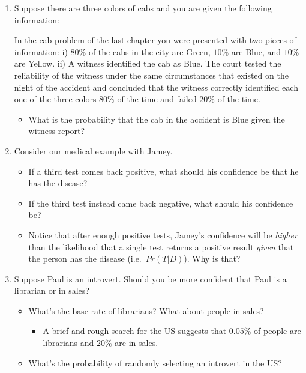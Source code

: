 \documentclass[]{tufte-book}
\providecommand{\tightlist}{%
  \setlength{\itemsep}{0pt}\setlength{\parskip}{0pt}}
\begin{document}
\begin{enumerate}
\def\labelenumi{\arabic{enumi}.}
\item
  Suppose there are three colors of cabs and you are given the following information:

  In the cab problem of the last chapter you were presented with two pieces of information: i) \(80\%\) of the cabs in the city are Green, \(10\%\) are Blue, and \(10\%\) are Yellow. ii) A witness identified the cab as Blue. The court tested the reliability of the witness under the same circumstances that existed on the night of the accident and concluded that the witness correctly identified each one of the three colors \(80\%\) of the time and failed \(20\%\) of the time.

  \begin{itemize}
  \tightlist
  \item
    What is the probability that the cab in the accident is Blue given the witness report?
  \end{itemize}
\item
  Consider our medical example with Jamey.

  \begin{itemize}
  \tightlist
  \item
    If a third test comes back positive, what should his confidence be that he has the disease?
  \item
    If the third test instead came back negative, what should his confidence be?
  \item
    Notice that after enough positive tests, Jamey's confidence will be \emph{higher} than the likelihood that a single test returns a positive result \emph{given} that the person has the disease (i.e.~\(Pr(T|D)\)). Why is that?
  \end{itemize}
\item
  Suppose Paul is an introvert. Should you be more confident that Paul is a librarian or in sales?

  \begin{itemize}
  \tightlist
  \item
    What's the base rate of librarians? What about people in sales?

    \begin{itemize}
    \tightlist
    \item
      A brief and rough search for the US suggests that \(0.05\%\) of people are librarians and \(20\%\) are in sales.
    \end{itemize}
  \item
    What's the probability of randomly selecting an introvert in the US?


\end{itemize}
\end{enumerate}
\end{document}
